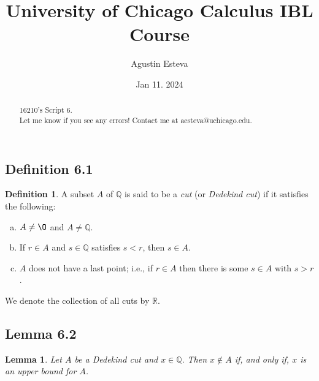 \documentclass[openany, amssymb, psamsfonts]{amsart}
\title{University of Chicago Calculus IBL Course}
\author{Agustin Esteva}
\date{Jan 11. 2024}
\newcommand{\bbQ}{\mathbb{Q}}
\newcommand{\bbR}{\mathbb{R}}
\renewcommand{\emptyset}{\O}
\newtheorem{lem}{Lemma}[section]
\theoremstyle{definition}
\newtheorem{defn}{Definition}[section]
\numberwithin{equation}{section}
\begin{document}
\begin{abstract}

16210's Script 6.\\ Let me know if you see any errors! Contact me at aesteva@uchicago.edu.


\end{abstract}

\maketitle

\tableofcontents
\setcounter{section}{6}


\subsection*{Definition 6.1}
\label{6.1}
\begin{defn} A subset $A$ of $\bbQ$ is said to be a \emph{cut} (or \emph{Dedekind cut}) if it satisfies the following: 
	\begin{enumerate}[(a)]

		\item $A \neq \emptyset$ and $A \neq {\mathbb Q}$.
  \label{6.1.a}

		\item If $r \in A$ and $s \in \bbQ$ satisfies $s < r$, then $s \in A$.
  \label{6.1.b}

		\item $A$ does not have a last point; i.e., if $r\in A$ then there is some $s \in A$ with $s > r$.
  \label{6.1.c}
	\end{enumerate}
	We denote the collection of all cuts by $\bbR$.
\end{defn}

\subsection*{Lemma 6.2}
\label{6.2}
\begin{lem}
Let $A$ be a Dedekind cut and $x\in \bbQ.$ Then $x \notin A$ if, and only if, $x$ is an upper bound for $A$.
\end{lem}
\end{document}
